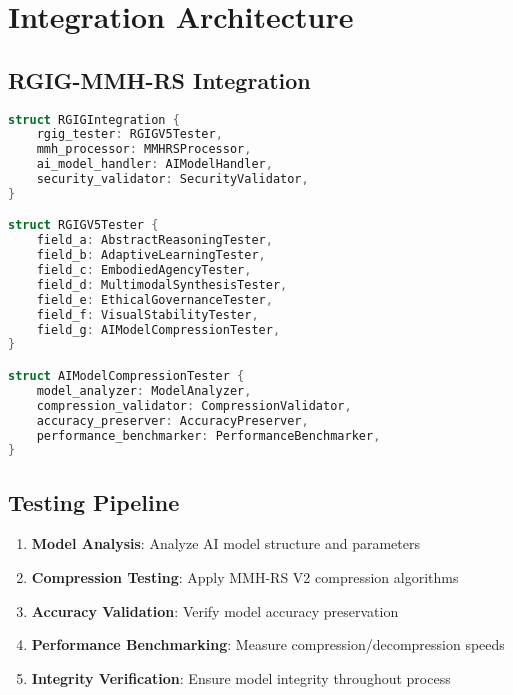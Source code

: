 \documentclass[12pt,a4paper]{article}
\begin{document}
\section{Integration Architecture}

\subsection{RGIG-MMH-RS Integration}
\begin{lstlisting}[language=Rust, caption=RGIG Integration Architecture]
struct RGIGIntegration {
    rgig_tester: RGIGV5Tester,
    mmh_processor: MMHRSProcessor,
    ai_model_handler: AIModelHandler,
    security_validator: SecurityValidator,
}

struct RGIGV5Tester {
    field_a: AbstractReasoningTester,
    field_b: AdaptiveLearningTester,
    field_c: EmbodiedAgencyTester,
    field_d: MultimodalSynthesisTester,
    field_e: EthicalGovernanceTester,
    field_f: VisualStabilityTester,
    field_g: AIModelCompressionTester,
}

struct AIModelCompressionTester {
    model_analyzer: ModelAnalyzer,
    compression_validator: CompressionValidator,
    accuracy_preserver: AccuracyPreserver,
    performance_benchmarker: PerformanceBenchmarker,
}
\end{lstlisting}

\subsection{Testing Pipeline}
\begin{enumerate}
    \item \textbf{Model Analysis}: Analyze AI model structure and parameters
    \item \textbf{Compression Testing}: Apply MMH-RS V2 compression algorithms
    \item \textbf{Accuracy Validation}: Verify model accuracy preservation
    \item \textbf{Performance Benchmarking}: Measure compression/decompression speeds
    \item \textbf{Integrity Verification}: Ensure model integrity throughout process
\end{enumerate}

\end{document}
